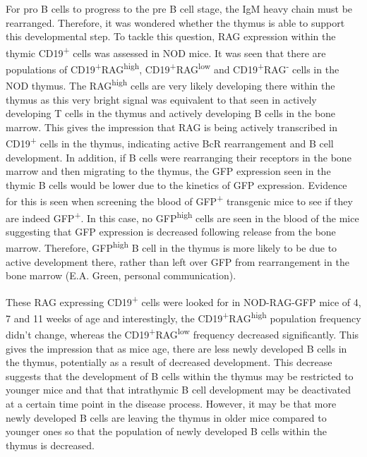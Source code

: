For pro B cells to progress to the pre B cell stage, the IgM heavy chain must be rearranged.
Therefore, it was wondered whether the thymus is able to support this developmental step.
To tackle this question, RAG expression within the thymic CD19\textsuperscript{+} cells was assessed in NOD mice.
It was seen that there are populations of CD19\textsuperscript{+}RAG\textsuperscript{high}, CD19\textsuperscript{+}RAG\textsuperscript{low} and CD19\textsuperscript{+}RAG\textsuperscript{-} cells in the NOD thymus.
The RAG\textsuperscript{high} cells are very likely developing there within the thymus as this very bright signal was equivalent to that seen in actively developing T cells in the thymus and actively developing B cells in the bone marrow.
This gives the impression that RAG is being actively transcribed in CD19\textsuperscript{+} cells in the thymus, indicating active BcR rearrangement and B cell development.
In addition, if B cells were rearranging their receptors in the bone marrow and then migrating to the thymus, the GFP expression seen in the thymic B cells would be lower due to the kinetics of GFP expression.
Evidence for this is seen when screening the blood of GFP\textsuperscript{+} transgenic mice to see if they are indeed GFP\textsuperscript{+}. In this case, no GFP\textsuperscript{high} cells are seen in the blood of the mice suggesting that GFP expression is decreased following release from the bone marrow. Therefore, GFP\textsuperscript{high} B cell in the thymus is more likely to be due to active development there, rather than left over GFP from rearrangement in the bone marrow (E.A. Green, personal communication).

These RAG expressing CD19\textsuperscript{+} cells were looked for in NOD-RAG-GFP mice of 4, 7 and 11 weeks of age and interestingly, the CD19\textsuperscript{+}RAG\textsuperscript{high} population frequency didn't change, whereas the CD19\textsuperscript{+}RAG\textsuperscript{low} frequency decreased significantly.
This gives the impression that as mice age, there are less newly developed B cells in the thymus, potentially as a result of decreased development.
This decrease suggests that the development of B cells within the thymus may be restricted to younger mice and that that intrathymic B cell development may be deactivated at a certain time point in the disease process.
However, it may be that more newly developed B cells are leaving the thymus in older mice compared to younger ones so that the population of newly developed B cells within the thymus is decreased.

